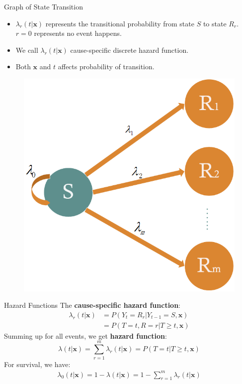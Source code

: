 \documentclass{beamer}
\begin{document}
    \begin{frame}{Graph of State Transition}
        \begin{itemize}
            \item $\lambda_r(t|\mathbf{x})$ represents the transitional probability from state $S$ to state $R_r$. $r=0$ represents no event happens.
            \item  We call $\lambda_r(t|\mathbf{x})$ cause-specific discrete hazard function.
            \item Both $\mathbf{x}$ and $t$ affects probability of transition.
        \end{itemize}
        \begin{figure}
            \centering
            \includegraphics[scale=0.3]{./transition.png}
        \end{figure}
    \end{frame}
    
    \begin{frame}{Hazard Functions}
        The {\bf cause-specific hazard function}:
        \begin{align*}
        \lambda_r(t|\mathbf{x}) &= P(Y_t = R_r | Y_{t-1} = S, \mathbf{x}) \\
        &= P(T = t, R = r | T \geq t, \mathbf{x})
        \end{align*}
        Summing up for all events, we get {\bf hazard function}:
        \begin{equation*}
        \lambda(t|\mathbf{x}) = \sum_{r = 1}^{m} \lambda_r(t|\mathbf{x}) = P(T = t | T \geq t, \mathbf{x})
        \end{equation*}
        For survival, we have:
        \begin{align*}
        \lambda_0(t|\mathbf{x}) 
        = 1 - \lambda(t|\mathbf{x}) 
        = 1- \sum_{r = 1}^{m} \lambda_r(t|\mathbf{x})
        \end{align*}
    \end{frame}
    
\end{document}

